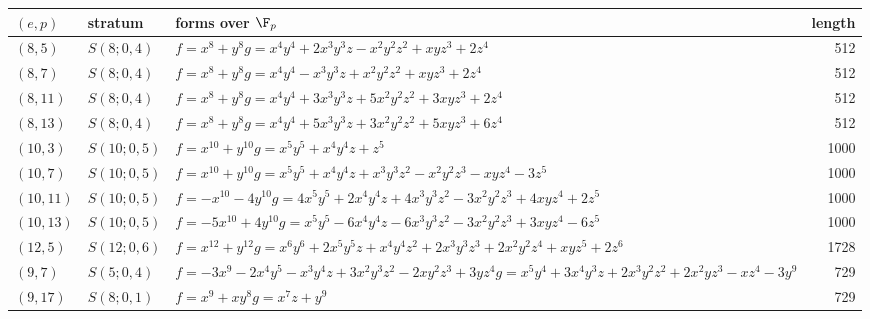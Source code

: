\begin{tabular}{@{}ll>{\raggedright\arraybackslash}p{6.4cm}r@{}}
\toprule
$(e,p)$ & stratum & forms over $\F_p$ & length\\
\midrule
$(8,5)$ & $S(8;0,4)$ & $f=x^{8} + y^{8}$\newline $g=x^{4}y^{4} + 2x^{3}y^{3}z - x^{2}y^{2}z^{2} + xyz^{3} + 2z^{4}$ & 512\\
$(8,7)$ & $S(8;0,4)$ & $f=x^{8} + y^{8}$\newline $g=x^{4}y^{4} - x^{3}y^{3}z + x^{2}y^{2}z^{2} + xyz^{3} + 2z^{4}$ & 512\\
$(8,11)$ & $S(8;0,4)$ & $f=x^{8} + y^{8}$\newline $g=x^{4}y^{4} + 3x^{3}y^{3}z + 5x^{2}y^{2}z^{2} + 3xyz^{3} + 2z^{4}$ & 512\\
$(8,13)$ & $S(8;0,4)$ & $f=x^{8} + y^{8}$\newline $g=x^{4}y^{4} + 5x^{3}y^{3}z + 3x^{2}y^{2}z^{2} + 5xyz^{3} + 6z^{4}$ & 512\\
$(10,3)$ & $S(10;0,5)$ & $f=x^{10} + y^{10}$\newline $g=x^{5}y^{5} + x^{4}y^{4}z + z^{5}$ & 1000\\
$(10,7)$ & $S(10;0,5)$ & $f=x^{10} + y^{10}$\newline $g=x^{5}y^{5} + x^{4}y^{4}z + x^{3}y^{3}z^{2} - x^{2}y^{2}z^{3} - xyz^{4} - 3z^{5}$ & 1000\\
$(10,11)$ & $S(10;0,5)$ & $f=-x^{10} - 4y^{10}$\newline $g=4x^{5}y^{5} + 2x^{4}y^{4}z + 4x^{3}y^{3}z^{2} - 3x^{2}y^{2}z^{3} + 4xyz^{4} + 2z^{5}$ & 1000\\
$(10,13)$ & $S(10;0,5)$ & $f=-5x^{10} + 4y^{10}$\newline $g=x^{5}y^{5} - 6x^{4}y^{4}z - 6x^{3}y^{3}z^{2} - 3x^{2}y^{2}z^{3} + 3xyz^{4} - 6z^{5}$ & 1000\\
$(12,5)$ & $S(12;0,6)$ & $f=x^{12} + y^{12}$\newline $g=x^{6}y^{6} + 2x^{5}y^{5}z + x^{4}y^{4}z^{2} + 2x^{3}y^{3}z^{3} + 2x^{2}y^{2}z^{4} + xyz^{5} + 2z^{6}$ & 1728\\
$(9,7)$ & $S(5;0,4)$ & $f=-3x^{9} - 2x^{4}y^{5} - x^{3}y^{4}z + 3x^{2}y^{3}z^{2} - 2xy^{2}z^{3} + 3yz^{4}$\newline $g=x^{5}y^{4} + 3x^{4}y^{3}z + 2x^{3}y^{2}z^{2} + 2x^{2}yz^{3} - xz^{4} - 3y^{9}$ & 729\\
$(9,17)$ & $S(8;0,1)$ & $f=x^{9} + xy^{8}$\newline $g=x^{7}z + y^{9}$ & 729\\
\bottomrule
\end{tabular}
